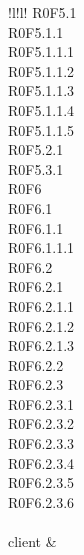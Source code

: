 \begin{tabella}{!{\VRule}l!{\VRule}l!{\VRule}}
{					R0F5.1 \\
					R0F5.1.1 \\
					R0F5.1.1.1 \\
					R0F5.1.1.2 \\
					R0F5.1.1.3 \\
					R0F5.1.1.4 \\
					R0F5.1.1.5 \\
					R0F5.2.1 \\
					R0F5.3.1 \\
					R0F6 \\
					R0F6.1 \\
					R0F6.1.1 \\
					R0F6.1.1.1 \\
					R0F6.2 \\
					R0F6.2.1 \\
					R0F6.2.1.1 \\ 
					R0F6.2.1.2 \\
					R0F6.2.1.3 \\ 
					R0F6.2.2 \\
					R0F6.2.3 \\
					R0F6.2.3.1 \\
					R0F6.2.3.2 \\
					R0F6.2.3.3 \\
					R0F6.2.3.4 \\
					R0F6.2.3.5 \\ 
					R0F6.2.3.6 \\
				} \\
				
	client & \cellacaporiga{
		
}
\end{tabella}
